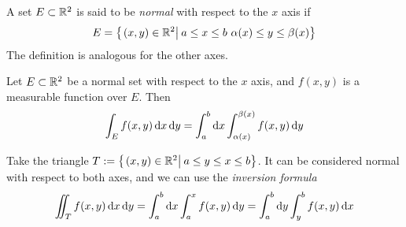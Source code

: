 \documentclass[../complete.tex]{subfiles}
\begin{document}
\begin{dfn}
	A set $E\subset\mathbb{R}^2$ is said to be \textit{normal} with respect to the $x$ axis if
	\begin{equation*}
		E=\left\{ \left.(x,y)\in\mathbb{R}^2\right|_{}a\le x\le b\ \alpha(x)\le y\le\beta(x) \right\}
	\end{equation*}
	The definition is analogous for the other axes.
\end{dfn}
\begin{thm}
	Let $E\subset\mathbb{R}^2$ be a normal set with respect to the $x$ axis, and $f(x,y)$ is a measurable function over $E$. Then
	\begin{equation}
		\int_{E}^{}f(x,y)\operatorname{d\!} x\operatorname{d\!} y=\int_{a}^{b}\operatorname{d\!} x\int_{\alpha(x)}^{\beta(x)}f(x,y)\operatorname{d\!} y
		\label{eq:normalintegration}
	\end{equation}
\end{thm}
\begin{thm}
	Take the triangle $T:=\left\{ \left.(x,y)\in\mathbb{R}^2\right|_{}a\le y\le x\le b \right\}$. It can be considered normal with respect to both axes, and we can use the \textit{inversion formula}
	\begin{equation}
		\iint_Tf(x,y)\operatorname{d\!} x\operatorname{d\!} y=\int_{a}^{b}\operatorname{d\!} x\int_{a}^{x}f(x,y)\operatorname{d\!} y=\int_{a}^{b}\operatorname{d\!} y\int_{y}^{b}f(x,y)\operatorname{d\!} x
		\label{eq:dirinversionformula}
	\end{equation}
\end{thm}
\end{document}
